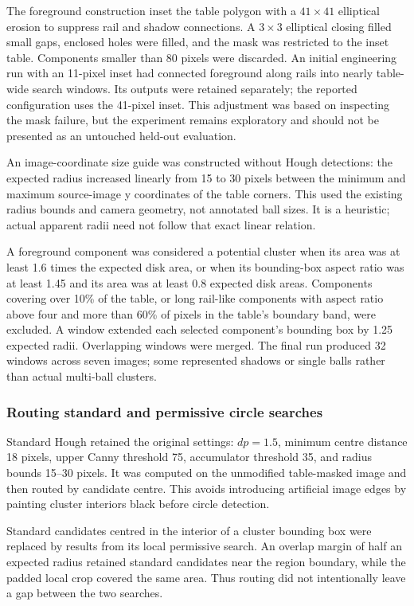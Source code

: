 The foreground construction inset the table polygon with a $41\times41$
elliptical erosion to suppress rail and shadow connections. A $3\times3$
elliptical closing filled small gaps, enclosed holes were filled, and the
mask was restricted to the inset table. Components smaller than 80 pixels
were discarded. An initial engineering run with an 11-pixel inset had
connected foreground along rails into nearly table-wide search windows.
Its outputs were retained separately; the reported configuration uses the
41-pixel inset. This adjustment was based on inspecting the mask failure,
but the experiment remains exploratory and should not be presented as an
untouched held-out evaluation.

An image-coordinate size guide was constructed without Hough detections:
the expected radius increased linearly from 15 to 30 pixels between the
minimum and maximum source-image y coordinates of the table corners.
This used the existing radius bounds and camera geometry, not annotated
ball sizes. It is a heuristic; actual apparent radii need not follow
that exact linear relation.

A foreground component was considered a potential cluster when its area
was at least 1.6 times the expected disk area, or when its bounding-box
aspect ratio was at least 1.45 and its area was at least 0.8 expected disk
areas. Components covering over 10\% of the table, or long rail-like
components with aspect ratio above four and more than 60\% of pixels in
the table's boundary band, were excluded. A window extended each selected
component's bounding box by 1.25 expected radii. Overlapping windows were
merged. The final run produced 32 windows across seven images; some
represented shadows or single balls rather than actual multi-ball clusters.

\subsubsection{Routing standard and permissive circle searches}

Standard Hough retained the original settings: $dp=1.5$, minimum centre
distance 18 pixels, upper Canny threshold 75, accumulator threshold 35,
and radius bounds 15--30 pixels. It was computed on the unmodified
table-masked image and then routed by candidate centre. This avoids
introducing artificial image edges by painting cluster interiors black
before circle detection.

Standard candidates centred in the interior of a cluster bounding box
were replaced by results from its local permissive search. An overlap
margin of half an expected radius retained standard candidates near
the region boundary, while the padded local crop covered the same area.
Thus routing did not intentionally leave a gap between the two searches.

